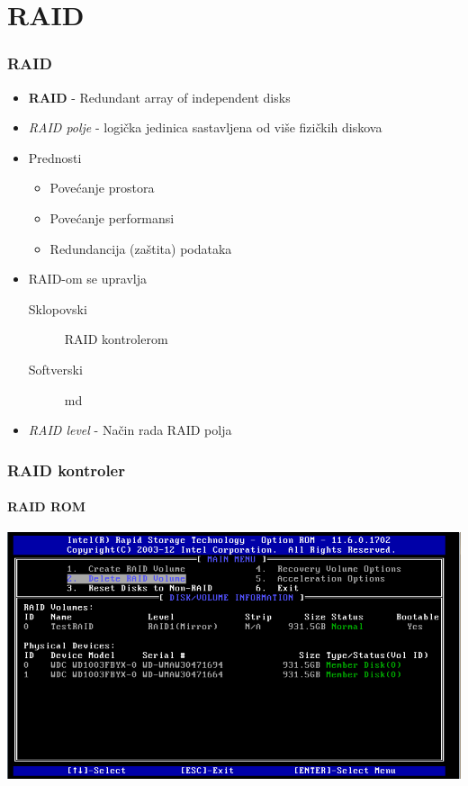 \documentclass[t]{beamer}
\begin{document}
\section{RAID}
\begin{frame}
	\frametitle{RAID}
	\begin{itemize}
		\item \textbf{RAID} - Redundant array of independent disks
	\end{itemize}
	\begin{itemize}
		\item \emph{RAID polje} - logička jedinica sastavljena od više fizičkih diskova
		\item Prednosti
		\begin{itemize}
			\item Povećanje prostora
			\item Povećanje performansi
			\item Redundancija (zaštita) podataka
		\end{itemize}
	\end{itemize}
	\begin{itemize}
		\item RAID-om se upravlja
		\begin{description}
			\item[Sklopovski] RAID kontrolerom
			\item[Softverski] md
		\end{description}
	\end{itemize}
	\begin{itemize}
		\item \emph{RAID level} - Način rada RAID polja
	\end{itemize}
\end{frame}

\begin{frame}
	\frametitle{RAID kontroler}
	\framesubtitle{RAID ROM}
	\includegraphics[width=\textwidth]{Intel_RAID.png}
\end{frame}
\end{document}
